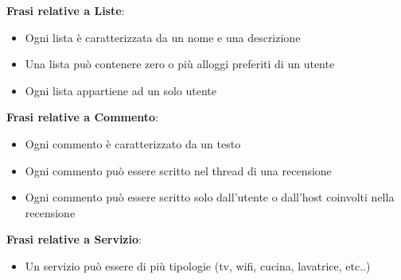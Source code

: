\bigskip
\textbf{Frasi relative a Liste}:
\begin{itemize}
    \item Ogni lista è caratterizzata da un nome e una descrizione
    \item Una lista può contenere zero o più alloggi preferiti di un utente
    \item Ogni lista appartiene ad un solo utente
\end{itemize}
\bigskip
\textbf{Frasi relative a Commento}:
\begin{itemize}
    \item Ogni commento è caratterizzato da un testo
    \item Ogni commento può essere scritto nel thread di una recensione
    \item Ogni commento può essere scritto solo dall'utente o dall'host coinvolti nella recensione
\end{itemize}
\textbf{Frasi relative a Servizio}:
\begin{itemize}
    \item Un servizio può essere di più tipologie (tv, wifi, cucina, lavatrice, etc..)
\end{itemize}
